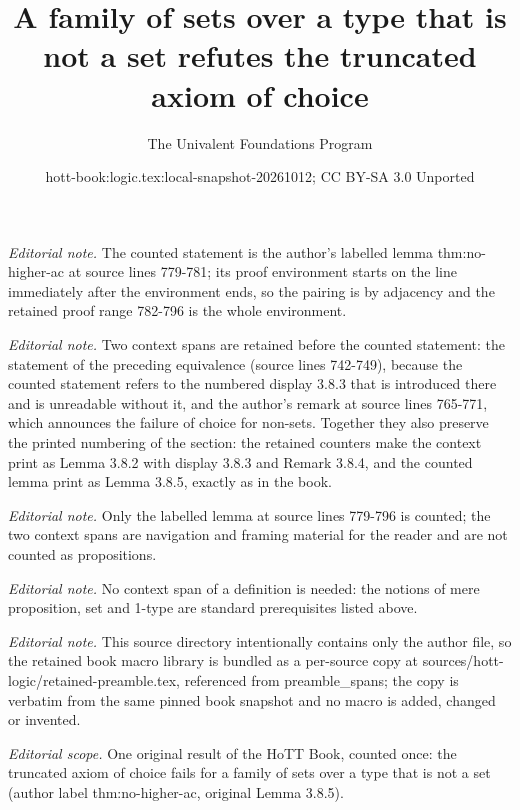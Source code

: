 \documentclass[10pt,a4paper]{article}
\title{A family of sets over a type that is not a set refutes the truncated axiom of choice}
\author{The Univalent Foundations Program}
\date{hott-book:logic.tex:local-snapshot-20261012; CC BY-SA 3.0 Unported}
\newcounter{chapter}
\theoremstyle{definition}
\theoremstyle{remark}
\numberwithin{equation}{section}
\begin{document}
\maketitle
\setcounter{chapter}{3}
\setcounter{section}{8}
\setcounter{thm}{1}
\noindent\textit{Editorial note.} The counted statement is the author's labelled lemma thm:no-higher-ac at source lines 779-781; its proof environment starts on the line immediately after the environment ends, so the pairing is by adjacency and the retained proof range 782-796 is the whole environment.\par\medskip
\noindent\textit{Editorial note.} Two context spans are retained before the counted statement: the statement of the preceding equivalence (source lines 742-749), because the counted statement refers to the numbered display 3.8.3 that is introduced there and is unreadable without it, and the author's remark at source lines 765-771, which announces the failure of choice for non-sets. Together they also preserve the printed numbering of the section: the retained counters make the context print as Lemma 3.8.2 with display 3.8.3 and Remark 3.8.4, and the counted lemma print as Lemma 3.8.5, exactly as in the book.\par\medskip
\noindent\textit{Editorial note.} Only the labelled lemma at source lines 779-796 is counted; the two context spans are navigation and framing material for the reader and are not counted as propositions.\par\medskip
\noindent\textit{Editorial note.} No context span of a definition is needed: the notions of mere proposition, set and 1-type are standard prerequisites listed above.\par\medskip
\noindent\textit{Editorial note.} This source directory intentionally contains only the author file, so the retained book macro library is bundled as a per-source copy at sources/hott-logic/retained-preamble.tex, referenced from preamble\_spans; the copy is verbatim from the same pinned book snapshot and no macro is added, changed or invented.\par\medskip
\noindent\textit{Editorial scope.} One original result of the HoTT Book, counted once: the truncated axiom of choice fails for a family of sets over a type that is not a set (author label thm:no-higher-ac, original Lemma 3.8.5).\par\medskip
\end{document}
